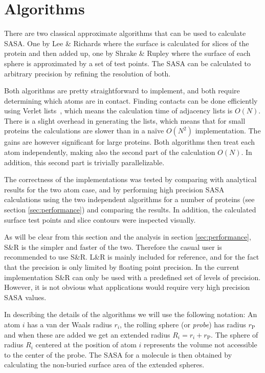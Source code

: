 \documentclass[a4paper,11pt]{article}
\begin{document}
\section{Algorithms}\label{sec:algorithm}

There are two classical approximate algorithms that can be used to
calculate SASA. One by Lee \& Richards \cite{LnR} where the surface is
calculated for slices of the protein and then added up, one by Shrake
\& Rupley \cite{SnR} where the surface of each sphere is approximated
by a set of test points. The SASA can be calculated to arbitrary
precision by refining the resolution of both. 

Both algorithms are pretty straightforward to implement, and both
require determining which atoms are in contact. Finding contacts can
be done efficiently using Verlet lists~\cite{Verlet}, which means the
calculation time of adjacency lists is $O(N)$. There is a slight
overhead in generating the lists, which means that for small proteins
the calculations are slower than in a na\"{i}ve $O(N^2)$
implementation. The gains are however significant for large
proteins. Both algorithms then treat each atom independently, making
also the second part of the calculation $O(N)$. In addition, this
second part is trivially parallelizable.

The correctness of the implementations was tested by comparing with
analytical results for the two atom case, and by performing high
precision SASA calculations using the two independent algorithms for a
number of proteins (see section \ref{sec:performance}) and comparing
the results. In addition, the calculated surface test points and slice
contours were inspected visually.

As will be clear from this section and the analysis in section
\ref{sec:performance}, S\&R is the simpler and faster of the
two. Therefore the casual user is recommended to use S\&R. L\&R is
mainly included for reference, and for the fact that the precision is
only limited by floating point precision. In the current
implementation S\&R can only be used with a predefined set of levels
of precision. However, it is not obvious what applications would
require very high precision SASA values.

In describing the details of the algorithms we will use the following
notation: An atom $i$ has a van der Waals radius $r_i$, the rolling
sphere (or \emph{probe}) has radius $r_\text{P}$ and when these are
added we get an extended radius $R_i = r_i + r_\text{P}$. The sphere
of radius $R_i$ centered at the position of atom $i$ represents the
volume not accessible to the center of the probe. The SASA for a
molecule is then obtained by calculating the non-buried surface area
of the extended spheres.
\end{document}

